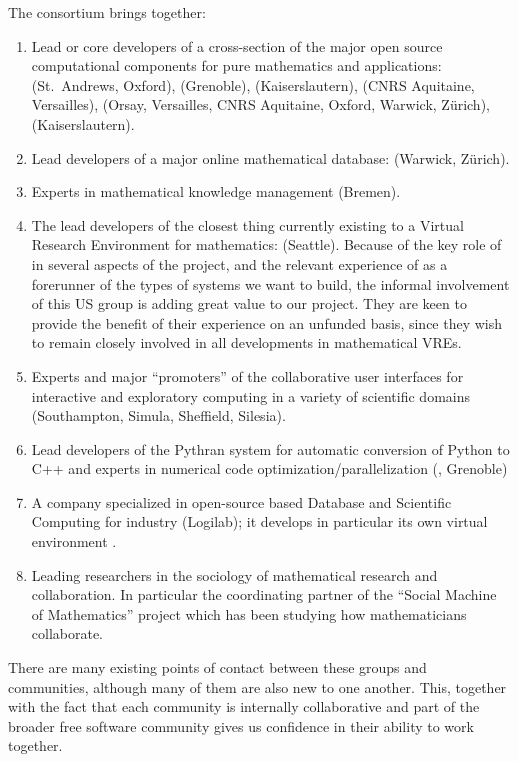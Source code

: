 The consortium brings together:
\begin{enumerate}
\item \label{mathsoftware} Lead or core developers of a cross-section of the major open
  source computational components for pure mathematics and applications: \GAP (St.~Andrews,
  Oxford), \Linbox (Grenoble), \MPIR (Kaiserslautern), \Pari (CNRS Aquitaine, Versailles), \Sage
  (Orsay, Versailles, CNRS Aquitaine, Oxford, Warwick, Zürich), \Singular (Kaiserslautern).
\item \label{mathdb} Lead developers of a major online mathematical database: \LMFDB
  (Warwick, Zürich).
\item \label{mathknowledge} Experts in mathematical knowledge management (Bremen).
\item \label{smc} The lead developers of the closest thing currently existing to a Virtual
  Research Environment for mathematics: \SMC (Seattle). Because of the key role of \Sage
  in several aspects of the project, and the relevant experience of \SMC as a forerunner of the types
  of systems we want to build, the informal involvement of this US group is adding great value to our project.
  They are keen to provide the benefit of their experience on an unfunded basis, since they wish to remain closely involved in
  all developments in mathematical VREs.
\item \label{jupyter} Experts and major ``promoters'' of the \Jupyter collaborative user
  interfaces for interactive and exploratory computing in a variety of scientific domains
  (Southampton, Simula, Sheffield, Silesia).
\item \label{pythran} Lead developers of the Pythran system for automatic conversion of
  Python to C++ and experts in numerical code optimization/parallelization (,
  Grenoble)
\item \label{logilab} A company specialized in open-source based Database and Scientific
  Computing for industry (Logilab); it develops in particular its own virtual environment
  \Simulagora.
\item \label{social} Leading researchers in the sociology of mathematical research and
  collaboration. In particular the coordinating partner of the ``Social Machine of
  Mathematics'' project which has been studying how mathematicians collaborate.
\end{enumerate}





There are many existing points of contact between these groups  and
communities, although many of them are also new to one another. This,
together with the fact that each community is internally collaborative
and part of the broader free software community gives us confidence in
their ability to work together.

